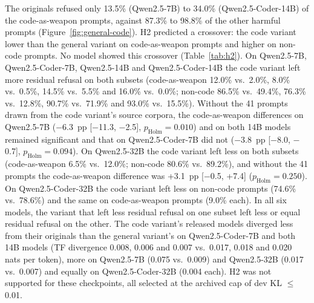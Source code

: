 The originals refused only 13.5\% (Qwen2.5-7B) to 34.0\% (Qwen2.5-Coder-14B) of the code-as-weapon prompts,
against 87.3\% to 98.8\% of the other harmful prompts (Figure~\ref{fig:general-code}). H2 predicted a crossover: the
code variant lower than the general variant on code-as-weapon prompts and higher on non-code prompts. No model showed
this crossover (Table~\ref{tab:h2}). On Qwen2.5-7B, Qwen2.5-Coder-7B, Qwen2.5-14B and Qwen2.5-Coder-14B the code
variant left more residual refusal on both subsets (code-as-weapon 12.0\% vs.\ 2.0\%, 8.0\% vs.\ 0.5\%, 14.5\% vs.\
5.5\% and 16.0\% vs.\ 0.0\%; non-code 86.5\% vs.\ 49.4\%, 76.3\% vs.\ 12.8\%, 90.7\% vs.\ 71.9\% and 93.0\% vs.\
15.5\%). Without the 41 prompts drawn from the code variant's source corpora, the code-as-weapon differences on
Qwen2.5-7B ($-$6.3~pp [$-$11.3, $-$2.5], $p_\mathrm{Holm}=0.010$) and on both 14B models remained significant and
that on Qwen2.5-Coder-7B did not ($-$3.8~pp [$-$8.0, $-$0.7], $p_\mathrm{Holm}=0.094$). On Qwen2.5-32B the code
variant left less on both subsets (code-as-weapon 6.5\% vs.\ 12.0\%; non-code 80.6\% vs.\ 89.2\%), and without the
41 prompts the code-as-weapon difference was +3.1~pp [$-$0.5, +7.4] ($p_\mathrm{Holm}=0.250$). On
Qwen2.5-Coder-32B the code variant left less on non-code prompts (74.6\% vs.\ 78.6\%) and the same on code-as-weapon
prompts (9.0\% each). In all six models, the variant that left less residual refusal on one subset left less or equal
residual refusal on the other. The code variant's released models diverged less from their originals than the
general variant's on Qwen2.5-Coder-7B and both 14B models (TF divergence 0.008, 0.006 and 0.007 vs.\ 0.017, 0.018
and 0.020 nats per token), more on Qwen2.5-7B (0.075 vs.\ 0.009) and Qwen2.5-32B (0.017 vs.\ 0.007) and equally on
Qwen2.5-Coder-32B (0.004 each). H2 was not supported for these checkpoints, all selected at the archived cap of dev
KL $\le$ 0.01.


